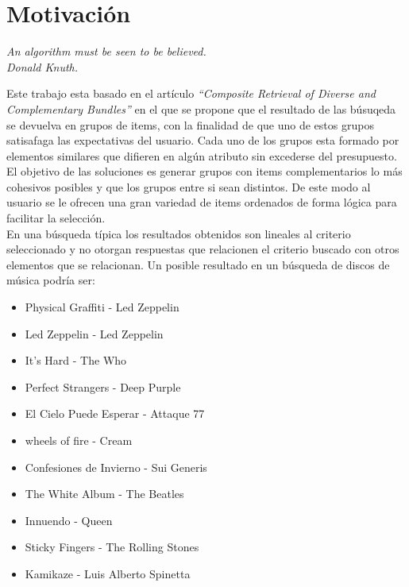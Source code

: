 \section{Motivación}
{\begin{small}%
\begin{flushright}%
\it An algorithm must be seen to be believed.\\Donald Knuth.
\end{flushright}%
\end{small}%
\vspace{.5cm}}
Este trabajo esta basado en el artículo \textit{\textquotedblleft Composite Retrieval of Diverse 
and Complementary Bundles\textquotedblright}\cite{compositeRetrival} en el que se propone 
que el resultado de las búsuqeda se devuelva en grupos de items, con la finalidad de que uno de estos grupos satisafaga
las expectativas del usuario. Cada uno de los grupos esta formado por elementos similares que difieren en algún atributo sin excederse del presupuesto.
El objetivo de las soluciones es generar grupos con items complementarios lo más cohesivos posibles y que los grupos entre si sean distintos.
De este modo al usuario se le ofrecen una gran variedad de items ordenados de forma lógica para facilitar la selección.\\

En una búsqueda típica los resultados obtenidos son lineales al criterio seleccionado y no otorgan respuestas que relacionen 
el criterio buscado con otros elementos que se relacionan. Un posible resultado en un búsqueda de discos de música podría ser:\\
\begin{itemize}
  \item Physical Graffiti - Led Zeppelin
  \item Led Zeppelin - Led Zeppelin
  \item It's Hard - The Who
  \item Perfect Strangers - Deep Purple
  \item El Cielo Puede Esperar - Attaque 77
  \item wheels of fire - Cream
  \item Confesiones de Invierno - Sui Generis
  \item The White Album - The Beatles
  \item Innuendo - Queen
  \item Sticky Fingers - The Rolling Stones
  \item Kamikaze - Luis Alberto Spinetta
\end{itemize}

